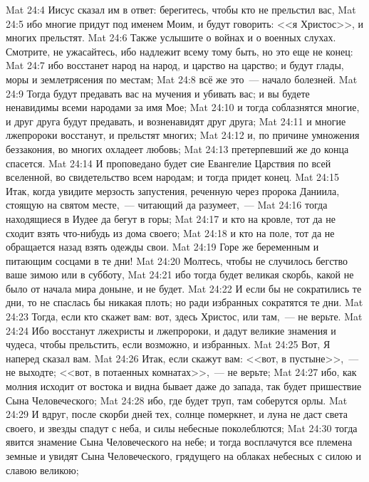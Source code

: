 \vs Mat 24:4 Иисус сказал им в ответ: берегитесь, чтобы кто не прельстил вас,
\vs Mat 24:5 ибо многие придут под именем Моим, и будут говорить: <<я Христос>>, и многих прельстят.
\vs Mat 24:6 Также услышите о войнах и о военных слухах. Смотрите, не ужасайтесь, ибо надлежит всему тому быть, но это еще не конец:
\vs Mat 24:7 ибо восстанет народ на народ, и царство на царство; и будут глады, моры и землетрясения по местам;
\vs Mat 24:8 всё же это~--- начало болезней.
\vs Mat 24:9 Тогда будут предавать вас на мучения и убивать вас; и вы будете ненавидимы всеми народами за имя Мое;
\vs Mat 24:10 и тогда соблазнятся многие, и друг друга будут предавать, и возненавидят друг друга;
\vs Mat 24:11 и многие лжепророки восстанут, и прельстят многих;
\vs Mat 24:12 и, по причине умножения беззакония, во многих охладеет любовь;
\vs Mat 24:13 претерпевший же до конца спасется.
\vs Mat 24:14 И проповедано будет сие Евангелие Царствия по всей вселенной, во свидетельство всем народам; и тогда придет конец.
\vs Mat 24:15 Итак, когда увидите мерзость запустения, реченную через пророка Даниила, стоящую на святом месте,~--- читающий да разумеет,~---
\vs Mat 24:16 тогда находящиеся в Иудее да бегут в горы;
\vs Mat 24:17 и кто на кровле, тот да не сходит взять что-нибудь из дома своего;
\vs Mat 24:18 и кто на поле, тот да не обращается назад взять одежды свои.
\vs Mat 24:19 Горе же беременным и питающим сосцами в те дни!
\vs Mat 24:20 Молтесь, чтобы не случилось бегство ваше зимою или в субботу,
\vs Mat 24:21 ибо тогда будет великая скорбь, какой не было от начала мира доныне, и не будет.
\vs Mat 24:22 И если бы не сократились те дни, то не спаслась бы никакая плоть; но ради избранных сократятся те дни.
\vs Mat 24:23 Тогда, если кто скажет вам: вот, здесь Христос, или там,~--- не верьте.
\vs Mat 24:24 Ибо восстанут лжехристы и лжепророки, и дадут великие знамения и чудеса, чтобы прельстить, если возможно, и избранных.
\vs Mat 24:25 Вот, Я наперед сказал вам.
\vs Mat 24:26 Итак, если скажут вам: <<вот,  в пустыне>>,~--- не выходте; <<вот,  в потаенных комнатах>>,~--- не верьте;
\vs Mat 24:27 ибо, как молния исходит от востока и видна бывает даже до запада, так будет пришествие Сына Человеческого;
\vs Mat 24:28 ибо, где будет труп, там соберутся орлы.
\vs Mat 24:29 И вдруг, после скорби дней тех, солнце померкнет, и луна не даст света своего, и звезды спадут с неба, и силы небесные поколеблются;
\vs Mat 24:30 тогда явится знамение Сына Человеческого на небе; и тогда восплачутся все племена земные и увидят Сына Человеческого, грядущего на облаках небесных с силою и славою великою;
